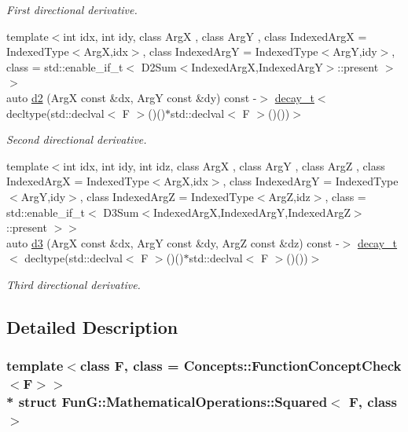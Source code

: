 \begin{DoxyCompactItemize}
\begin{DoxyCompactList}\small\item\em First directional derivative. \end{DoxyCompactList}\item 
{\footnotesize template$<$int idx, int idy, class ArgX , class ArgY , class Indexed\+ArgX  = Indexed\+Type$<$\+Arg\+X,idx$>$, class Indexed\+ArgY  = Indexed\+Type$<$\+Arg\+Y,idy$>$, class  = std\+::enable\+\_\+if\+\_\+t$<$ D2\+Sum$<$\+Indexed\+Arg\+X,\+Indexed\+Arg\+Y$>$\+::present $>$$>$ }\\auto \hyperlink{structFunG_1_1MathematicalOperations_1_1Squared_a242fd8a14c0fc68070e8beb7527968be}{d2} (ArgX const \&dx, ArgY const \&dy) const -\/$>$ \hyperlink{namespaceFunG_a195ac37d8696970c89b112c81a1e4d6e}{decay\+\_\+t}$<$ decltype(std\+::declval$<$ F $>$()()$\ast$std\+::declval$<$ F $>$()())$>$
\begin{DoxyCompactList}\small\item\em Second directional derivative. \end{DoxyCompactList}\item 
{\footnotesize template$<$int idx, int idy, int idz, class ArgX , class ArgY , class ArgZ , class Indexed\+ArgX  = Indexed\+Type$<$\+Arg\+X,idx$>$, class Indexed\+ArgY  = Indexed\+Type$<$\+Arg\+Y,idy$>$, class Indexed\+ArgZ  = Indexed\+Type$<$\+Arg\+Z,idz$>$, class  = std\+::enable\+\_\+if\+\_\+t$<$ D3\+Sum$<$\+Indexed\+Arg\+X,\+Indexed\+Arg\+Y,\+Indexed\+Arg\+Z$>$\+::present $>$$>$ }\\auto \hyperlink{structFunG_1_1MathematicalOperations_1_1Squared_a262e69cb557d5beb33f3d2c4da561215}{d3} (ArgX const \&dx, ArgY const \&dy, ArgZ const \&dz) const -\/$>$ \hyperlink{namespaceFunG_a195ac37d8696970c89b112c81a1e4d6e}{decay\+\_\+t}$<$ decltype(std\+::declval$<$ F $>$()()$\ast$std\+::declval$<$ F $>$()())$>$
\begin{DoxyCompactList}\small\item\em Third directional derivative. \end{DoxyCompactList}\end{DoxyCompactItemize}


\subsection{Detailed Description}
\subsubsection*{template$<$class F, class = Concepts\+::\+Function\+Concept\+Check$<$\+F$>$$>$\\*
struct Fun\+G\+::\+Mathematical\+Operations\+::\+Squared$<$ F, class $>$}


